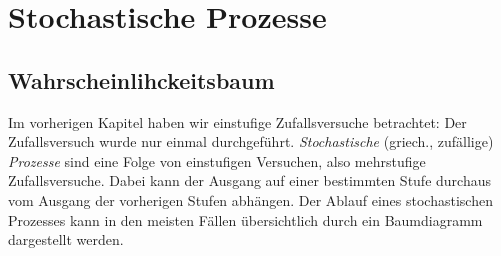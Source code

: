 \documentclass[%
11pt,%
twoside,%
titlepage,%
german,%
headsepline%
]{scrartcl}
\begin{document}
\section{Stochastische Prozesse}

\subsection{Wahrscheinlihckeitsbaum}

Im vorherigen Kapitel haben wir einstufige Zufallsversuche betrachtet: Der Zufallsversuch wurde nur einmal durchgeführt. \emph{Stochastische} (griech., zufällige) \emph{Prozesse} sind eine Folge von einstufigen Versuchen, also mehrstufige Zufallsversuche. Dabei kann der Ausgang auf einer bestimmten Stufe durchaus vom Ausgang der vorherigen Stufen abhängen. Der Ablauf eines stochastischen Prozesses kann in den meisten Fällen übersichtlich durch ein Baumdiagramm dargestellt werden.
\end{document}
